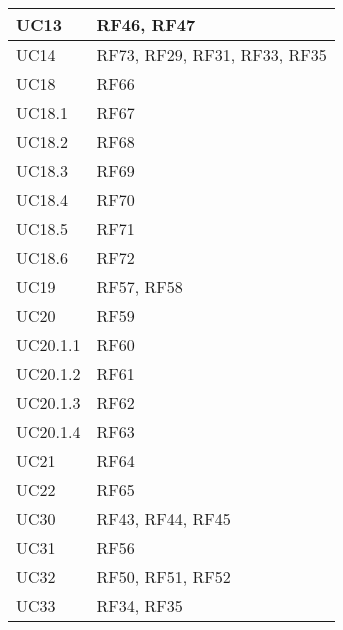\begin{center}
\begin{longtable}{|C{5cm}|C{5cm}|}
        \hline
        UC13 & RF46, RF47 \\
        \hline
        UC14 & RF73, RF29, RF31, RF33, RF35 \\
        \hline
        UC18 & RF66 \\
        \hline
        UC18.1 & RF67 \\
        \hline
        UC18.2 & RF68 \\
        \hline
        UC18.3 & RF69 \\
        \hline
        UC18.4 & RF70 \\
        \hline
        UC18.5 & RF71 \\
        \hline
        UC18.6 & RF72 \\
        \hline
        UC19 & RF57, RF58 \\
        \hline
        UC20 & RF59 \\
        \hline
        UC20.1.1 & RF60 \\
        \hline
        UC20.1.2 & RF61 \\
        \hline
        UC20.1.3 & RF62 \\
        \hline
        UC20.1.4 & RF63 \\
        \hline
        UC21 & RF64 \\
        \hline
        UC22 & RF65 \\
        \hline
        UC30 & RF43, RF44, RF45 \\
        \hline
        UC31 & RF56 \\
        \hline
        UC32 & RF50, RF51, RF52 \\
        \hline
        UC33 & RF34, RF35 \\
        \hline
    \end{longtable}
\end{center}
